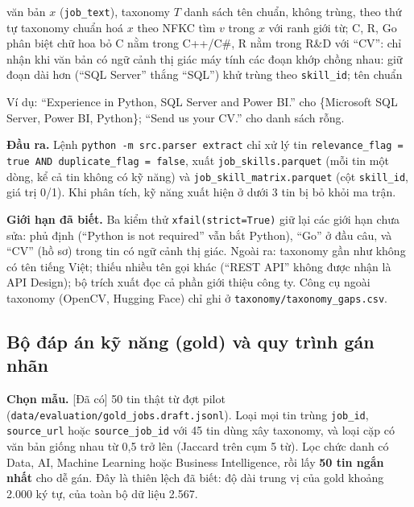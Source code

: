 \documentclass[12pt]{article}
\newcommand{\code}[1]{\texttt{#1}}
\newcommand{\dacoi}{\textsf{[Đã có]}}
\begin{document}
\begin{algorithm}[htbp]
\caption{Trích kỹ năng từ văn bản một tin}
\label{alg:parser}
\begin{algorithmic}[1]
\Require văn bản $x$ (\code{job\_text}), taxonomy $T$
\Ensure danh sách tên chuẩn, không trùng, theo thứ tự taxonomy
\State chuẩn hoá $x$ theo NFKC
  \State tìm $v$ trong $x$ với ranh giới từ; C, R, Go phân biệt chữ hoa
  \State bỏ C nằm trong C++/C\#, R nằm trong R\&D
  \State với ``CV'': chỉ nhận khi văn bản có ngữ cảnh thị giác máy tính
\EndFor
\State các đoạn khớp chồng nhau: giữ đoạn dài hơn (``SQL Server'' thắng ``SQL'')
\State khử trùng theo \code{skill\_id}; \Return tên chuẩn
\end{algorithmic}
\end{algorithm}

Ví dụ: ``Experience in Python, SQL Server and Power BI.'' cho \{Microsoft SQL Server, Power BI, Python\}; ``Send us your CV.'' cho danh sách rỗng.

\textbf{Đầu ra.} Lệnh \code{python -m src.parser extract} chỉ xử lý tin \code{relevance\_flag = true AND duplicate\_flag = false}, xuất \code{job\_skills.parquet} (mỗi tin một dòng, kể cả tin không có kỹ năng) và \code{job\_skill\_matrix.parquet} (cột \code{skill\_id}, giá trị 0/1). Khi phân tích, kỹ năng xuất hiện ở dưới 3 tin bị bỏ khỏi ma trận.

\textbf{Giới hạn đã biết.} Ba kiểm thử \code{xfail(strict=True)} giữ lại các giới hạn chưa sửa: phủ định (``Python is not required'' vẫn bắt Python), ``Go'' ở đầu câu, và ``CV'' (hồ sơ) trong tin có ngữ cảnh thị giác. Ngoài ra: taxonomy gần như không có tên tiếng Việt; thiếu nhiều tên gọi khác (``REST API'' không được nhận là API Design); bộ trích xuất đọc cả phần giới thiệu công ty. Công cụ ngoài taxonomy (OpenCV, Hugging Face) chỉ ghi ở \code{taxonomy/taxonomy\_gaps.csv}.

\subsection{Bộ đáp án kỹ năng (gold) và quy trình gán nhãn}
\label{sec:gold}

\textbf{Chọn mẫu.} \dacoi{} 50 tin thật từ đợt pilot (\code{data/evaluation/gold\_jobs.draft.jsonl}). Loại mọi tin trùng \code{job\_id}, \code{source\_url} hoặc \code{source\_job\_id} với 45 tin dùng xây taxonomy, và loại cặp có văn bản giống nhau từ 0,5 trở lên (Jaccard trên cụm 5 từ). Lọc chức danh có Data, AI, Machine Learning hoặc Business Intelligence, rồi lấy \textbf{50 tin ngắn nhất} cho dễ gán. Đây là thiên lệch đã biết: độ dài trung vị của gold khoảng 2.000 ký tự, của toàn bộ dữ liệu 2.567.
\end{document}
